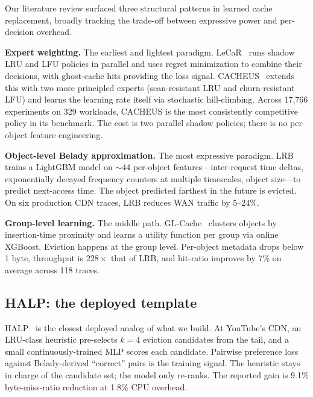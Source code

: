 \documentclass[letterpaper,twocolumn,10pt]{article}
\begin{document}
Our literature review surfaced three structural patterns in learned
cache replacement, broadly tracking the trade-off between expressive
power and per-decision overhead.
 
\textbf{Expert weighting.} The earliest and lightest paradigm.
LeCaR~\cite{lecar} runs shadow LRU and LFU policies in parallel and
uses regret minimization to
combine their decisions, with ghost-cache hits providing the
loss signal. CACHEUS~\cite{cacheus} extends this with two
more principled experts (scan-resistant LRU and churn-resistant
LFU) and learns the learning rate itself via stochastic
hill-climbing. Across 17,766 experiments on 329 workloads,
CACHEUS is the most consistently competitive policy in its
benchmark. The cost is two parallel shadow policies; there is
no per-object feature engineering.
 
\textbf{Object-level Belady approximation.} The most expressive paradigm.
LRB~\cite{lrb} trains a LightGBM model on $\sim 44$ per-object
features---inter-request time deltas, exponentially decayed
frequency counters at multiple timescales, object size---to
predict next-access time. The object predicted farthest in the
future is evicted. On six production CDN traces, LRB reduces WAN
traffic by 5--24\%. 
 
\textbf{Group-level learning.} The middle path.
GL-Cache~\cite{glcache} clusters objects by insertion-time proximity
and learns a utility function per group via online XGBoost. Eviction
happens at the group level. Per-object metadata drops below 1
byte, throughput is $228\times$ that of LRB, and hit-ratio improves
by 7\% on average across 118 traces.
 
 
\subsection{HALP: the deployed template}
 
HALP~\cite{halp} is the closest deployed analog of what we build.
At YouTube's CDN, an LRU-class heuristic pre-selects $k=4$ eviction
candidates from the tail, and a small continuously-trained MLP
scores each candidate. Pairwise preference loss against
Belady-derived ``correct'' pairs is the training signal. The
heuristic stays in charge of the candidate set; the model only
re-ranks. The reported gain is 9.1\% byte-miss-ratio reduction at
1.8\% CPU overhead.
 
\end{document}
